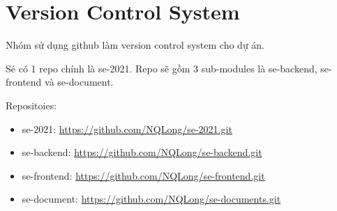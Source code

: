 \documentclass[a4paper]{article}
\begin{document}









\section{Version Control System}

Nhóm sử dụng github làm version control system cho dự án.

Sé có 1 repo chính là se-2021. Repo sẽ gồm 3 sub-modules là se-backend, se-frontend và se-document.

Repositoies:
\begin{itemize}
    \item se-2021: \url{https://github.com/NQLong/se-2021.git}
    \item se-backend: \url{https://github.com/NQLong/se-backend.git}
    \item se-frontend: \url{https://github.com/NQLong/se-frontend.git}
    \item se-document: \url{https://github.com/NQLong/se-documents.git}
    
\end{itemize}


\end{document}
